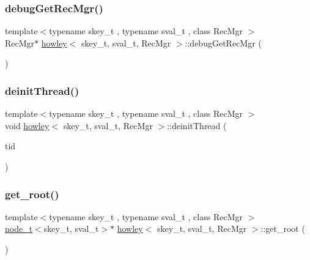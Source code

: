 \mbox{\label{classhowley_a9581b4d5eb22feca0cd2ac799a0c6145}} 
\subsubsection{\texorpdfstring{debug\+Get\+Rec\+Mgr()}{debugGetRecMgr()}}
{\footnotesize\ttfamily template$<$typename skey\+\_\+t , typename sval\+\_\+t , class Rec\+Mgr $>$ \\
Rec\+Mgr$\ast$ \hyperlink{classhowley}{howley}$<$ skey\+\_\+t, sval\+\_\+t, Rec\+Mgr $>$\+::debug\+Get\+Rec\+Mgr (\begin{DoxyParamCaption}{ }\end{DoxyParamCaption})\hspace{0.3cm}{\ttfamily [inline]}}

\mbox{\label{classhowley_ad451346bdc013f8f91a66e864ff6118c}} 
\subsubsection{\texorpdfstring{deinit\+Thread()}{deinitThread()}}
{\footnotesize\ttfamily template$<$typename skey\+\_\+t , typename sval\+\_\+t , class Rec\+Mgr $>$ \\
void \hyperlink{classhowley}{howley}$<$ skey\+\_\+t, sval\+\_\+t, Rec\+Mgr $>$\+::deinit\+Thread (\begin{DoxyParamCaption}\item[{const int}]{tid }\end{DoxyParamCaption})\hspace{0.3cm}{\ttfamily [inline]}}

\mbox{\label{classhowley_a37175ef84b9e6c359dc5cc1148fa289b}} 
\subsubsection{\texorpdfstring{get\+\_\+root()}{get\_root()}}
{\footnotesize\ttfamily template$<$typename skey\+\_\+t , typename sval\+\_\+t , class Rec\+Mgr $>$ \\
\hyperlink{structnode__t}{node\+\_\+t}$<$skey\+\_\+t, sval\+\_\+t$>$$\ast$ \hyperlink{classhowley}{howley}$<$ skey\+\_\+t, sval\+\_\+t, Rec\+Mgr $>$\+::get\+\_\+root (\begin{DoxyParamCaption}{ }\end{DoxyParamCaption})\hspace{0.3cm}{\ttfamily [inline]}}


